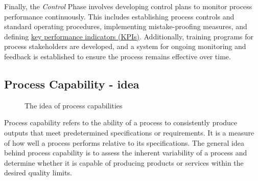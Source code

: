 \documentclass[
  a4paper,
]{scrbook}
\begin{document}
Finally, the \emph{Control} Phase involves developing control plans to
monitor process performance continuously. This includes establishing
process controls and standard operating procedures, implementing
mistake-proofing measures, and defining \hyperref[KPI]{key performance
indicators (KPIs)}. Additionally, training programs for process
stakeholders are developed, and a system for ongoing monitoring and
feedback is established to ensure the process remains effective over
time.

\newpage{}

\subsection{Process Capability - idea}\label{process-capability---idea}

\begin{figure}[H]


\caption{\label{fig-bullseye}The idea of process capabilities}

\end{figure}%

Process capability refers to the ability of a process to consistently
produce outputs that meet predetermined specifications or requirements.
It is a measure of how well a process performs relative to its
specifications. The general idea behind process capability is to assess
the inherent variability of a process and determine whether it is
capable of producing products or services within the desired quality
limits.
\end{document}
